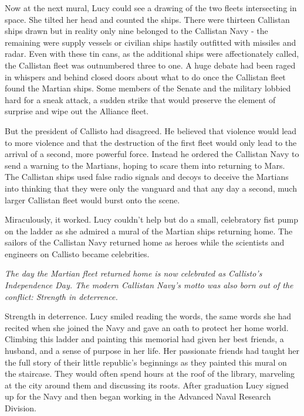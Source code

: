 \documentclass[openany, 12pt]{book} %
\let\footnote=\endnote
\begin{document}
Now at the next mural, Lucy could see a drawing of the two fleets intersecting in space. She tilted her head and counted the ships. There were thirteen Callistan ships drawn but in reality only nine belonged to the Callistan Navy - the remaining were supply vessels or civilian ships hastily outfitted with missiles and radar. Even with these tin cans\footnote{\textit{Tin can} is a nickname for U.S. destroyers.}, as the additional ships were affectionately called, the Callistan fleet was outnumbered three to one. A huge debate had been raged in whispers and behind closed doors about what to do once the Callistan fleet found the Martian ships. Some members of the Senate and the military lobbied hard for a sneak attack, a sudden strike that would preserve the element of surprise and wipe out the Alliance fleet.

But the president of Callisto had disagreed. He believed that violence would lead to more violence and that the destruction of the first fleet would only lead to the arrival of a second, more powerful force. Instead he ordered the Callistan Navy to send a warning to the Martians, hoping to scare them into returning to Mars. The Callistan ships used false radio signals and decoys to deceive the Martians into thinking that they were only the vanguard and that any day a second, much larger Callistan fleet would burst onto the scene.

Miraculously, it worked. Lucy couldn't help but do a small, celebratory fist pump on the ladder as she admired a mural of the Martian ships returning home. The sailors of the Callistan Navy returned home as heroes while the scientists and engineers on Callisto became celebrities.

\textit{The day the Martian fleet returned home is now celebrated as Callisto's Independence Day. The modern Callistan Navy's motto was also born out of the conflict: Strength in deterrence.}

Strength in deterrence. Lucy smiled reading the words, the same words she had recited when she joined the Navy and gave an oath to protect her home world. Climbing this ladder and painting this memorial had given her best friends, a husband, and a sense of purpose in her life. Her passionate friends had taught her the full story of their little republic's beginnings as they painted this mural on the staircase. They would often spend hours at the roof of the library, marveling at the city around them and discussing its roots. After graduation Lucy signed up for the Navy and then began working in the Advanced Naval Research Division. 
\end{document}
